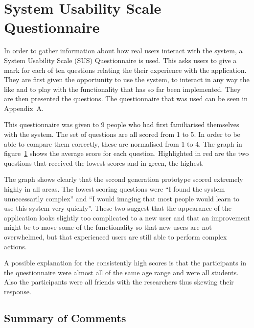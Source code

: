 \section{System Usability Scale Questionnaire}
\label{sec:system_usability_scale_questionnaire}

In order to gather information about how real users interact with the system, a
System Usability Scale (SUS) Questionnaire is used. This asks users to give a
mark for each of ten questions relating the their experience with the
application. They are first given the opportunity to use the system, to
interact in any way the like and to play with the functionality that has so far
been implemented. They are then presented the questions. The questionnaire that
was used can be seen in Appendix~A.

This questionnaire was given to 9 people who had first familiarised themselves
with the system. The set of questions are all scored from 1 to 5. In order to
be able to compare them correctly, these are normalised from 1 to 4. The graph
in figure~\ref{fig:evalGraph} shows the average score for each question.
Highlighted in red are the two questions that received the lowest scores and in
green, the highest.

\begin{figure}[h]
\centering

\caption{}\label{fig:evalGraph}
\end{figure}

The graph shows clearly that the second generation prototype scored extremely
highly in all areas. The lowest scoring questions were ``I found the system
unnecessarily complex'' and ``I would imaging that most people would learn to
use this system very quickly''. These two suggest that the appearance of the
application looks slightly too complicated to a new user and that an
improvement might be to move some of the functionality so that new users are
not overwhelmed, but that experienced users are still able to perform complex
actions.

A possible explanation for the consistently high scores is that the
participants in the questionnaire were almost all of the same age range and
were all students. Also the participants were all friends with the researchers
thus skewing their response.

\subsection{Summary of Comments}
\label{sub:summary_of_comments}


